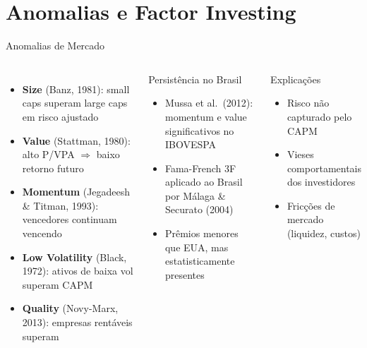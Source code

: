 \documentclass[aspectratio=169,12pt]{beamer}
\begin{document}
\section{Anomalias e Factor Investing}
\begin{frame}[fragile]{Anomalias de Mercado}
\begin{columns}[T]
\begin{itemize}
  \item \textbf{Size} (Banz, 1981): small caps superam large caps em risco ajustado
  \item \textbf{Value} (Stattman, 1980): alto P/VPA $\Rightarrow$ baixo retorno futuro
  \item \textbf{Momentum} (Jegadeesh \& Titman, 1993): vencedores continuam vencendo
  \item \textbf{Low Volatility} (Black, 1972): ativos de baixa vol superam CAPM
  \item \textbf{Quality} (Novy-Marx, 2013): empresas rentáveis superam
\end{itemize}
\begin{block}{Persistência no Brasil}
\begin{itemize}
  \item Mussa et al.\ (2012): momentum e value significativos no IBOVESPA
  \item Fama-French 3F aplicado ao Brasil por Málaga \& Securato (2004)
  \item Prêmios menores que EUA, mas estatisticamente presentes
\end{itemize}
\end{block}
\vspace{.3em}
\begin{alertblock}{Explicações}
\begin{itemize}
  \item Risco não capturado pelo CAPM
  \item Vieses comportamentais dos investidores
  \item Fricções de mercado (liquidez, custos)
\end{itemize}
\end{alertblock}
\end{columns}
\end{frame}
\end{document}
